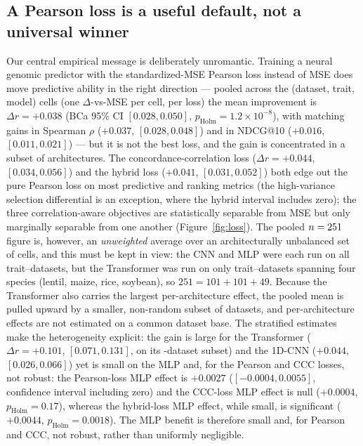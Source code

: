 \subsection{A Pearson loss is a useful default, not a universal winner}
Our central empirical message is deliberately unromantic. Training a neural
genomic predictor with the standardized-MSE Pearson loss instead of MSE does
move predictive ability in the right direction --- pooled across the
 (dataset, trait, model) cells (one $\Delta$-vs-MSE per cell, per loss) the mean improvement is $\Delta r = +0.038$ (BCa 95\%
CI $[0.028,0.050]$, $p_{\mathrm{Holm}}=1.2\times10^{-8}$), with matching gains in
Spearman $\rho$ ($+0.037$, $[0.028,0.048]$) and in NDCG@10 ($+0.016$,
$[0.011,0.021]$) --- but it is not the best loss, and the gain is concentrated in
a subset of architectures. The concordance-correlation loss ($\Delta r = +0.044$,
$[0.034,0.056]$) and the hybrid loss ($+0.041$, $[0.031,0.052]$) both edge out the
pure Pearson loss on most predictive and ranking metrics (the high-variance
selection differential is an exception, where the hybrid interval includes zero);
the three correlation-aware objectives are statistically separable from MSE but
only marginally separable from one another (Figure~\ref{fig:loss}). The pooled
$n=251$ figure is, however, an \emph{unweighted} average over an
architecturally unbalanced set of cells, and this must be kept in view: the CNN
and MLP were each run on all  trait--datasets, but the Transformer was
run on only  trait--datasets spanning four species (lentil, maize, rice,
soybean), so $251=101+101+49$. Because the Transformer also carries the largest
per-architecture effect, the pooled mean is pulled upward by a smaller,
non-random subset of datasets, and per-architecture effects are not estimated on a
common dataset base. The stratified estimates make the heterogeneity explicit: the
gain is large for the Transformer ($\Delta r = +0.101$, $[0.071,0.131]$, on its
-dataset subset) and the 1D-CNN ($+0.044$, $[0.026,0.066]$) yet is small
on the MLP and, for the Pearson and CCC losses, not robust: the Pearson-loss MLP
effect is $+0.0027$ ($[-0.0004,0.0055]$, confidence interval including zero) and
the CCC-loss MLP effect is null ($+0.0004$, $p_{\mathrm{Holm}}=0.17$), whereas the
hybrid-loss MLP effect, while small, is significant ($+0.0044$,
$p_{\mathrm{Holm}}=0.0018$). The MLP benefit is therefore small and, for Pearson
and CCC, not robust, rather than uniformly negligible.

